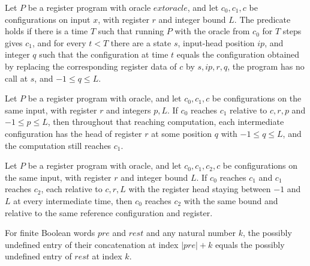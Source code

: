 \begin{definition}
\label{Complexity.LogProg.ReachesB}
\leanok
{}
Let $P$ be a register program with oracle $	ext{oracle}$, and let $c_0,c_1,c$ be
configurations on input $x$, with register $r$ and integer bound $L$. The predicate
holds if there is a time $T$ such that running $P$ with the oracle from $c_0$ for $T$
steps gives $c_1$, and for every $t<T$ there are a state $s$, input-head position $ip$,
and integer $q$ such that the configuration at time $t$ equals the configuration
obtained by replacing the corresponding register data of $c$ by $s,ip,r,q$, the program
has no call at $s$, and $-1\le q\le L$.
\end{definition}

\begin{lemma}
\label{Complexity.LogProg.Reaches.toB}
\leanok
{}
Let $P$ be a register program with oracle, and let $c_0,c_1,c$ be configurations on the
same input, with register $r$ and integers $p,L$. If $c_0$ reaches $c_1$ relative to
$c,r,p$ and $-1\le p\le L$, then throughout that reaching computation, each intermediate
configuration has the head of register $r$ at some position $q$ with $-1\le q\le L$, and
the computation still reaches $c_1$.
\end{lemma}

\begin{lemma}
\label{Complexity.LogProg.ReachesB.trans}
\leanok
{}
Let $P$ be a register program with oracle, and let $c_0,c_1,c_2,c$ be configurations on
the same input, with register $r$ and integer bound $L$. If $c_0$ reaches $c_1$ and
$c_1$ reaches $c_2$, each relative to $c,r,L$ with the register head staying between
$-1$ and $L$ at every intermediate time, then $c_0$ reaches $c_2$ with the same bound
and relative to the same reference configuration and register.
\end{lemma}

\begin{lemma}
\leanok
{}
For finite Boolean words $pre$ and $rest$ and any natural number $k$, the possibly
undefined entry of their concatenation at index $|pre|+k$ equals the possibly undefined
entry of $rest$ at index $k$.
\end{lemma}

